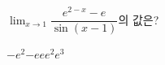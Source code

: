 $\displaystyle\lim_{x\to 1}\dfrac{e^{2-x}-e}{\sin(x-1)}$의 값은?
\begin{choices32}{$-e^2$}{$-e$}{$e$}{$e^2$}{$e^3$}\end{choices32}
